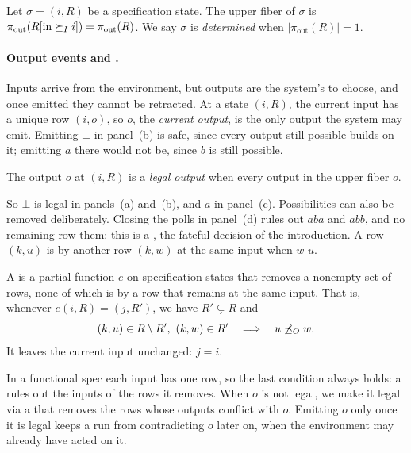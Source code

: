 \begin{definition}
\label{def:determined}
Let $\sigma = (i, R)$ be a specification state.  The upper fiber of $\sigma$
is $\pi_{\mathrm{out}}(R[\mathrm{in}\succeq_I i]) = \pi_{\mathrm{out}}(R)$.
We say $\sigma$ is \emph{determined} when $|\pi_{\mathrm{out}}(R)|=1$.
\end{definition}

\paragraph{Output events and \commitments.}
Inputs arrive from the environment, but outputs are the system's to choose, and
once emitted they cannot be retracted.  At a state $(i,R)$, the current input
has a unique row $(i,o)$, so $o$, the \emph{current output}, is the only output
the system may emit.  Emitting $\bot$ in panel~(b) is safe, since every output
still possible builds on it; emitting $a$ there would not be, since $b$ is
still possible.

\begin{definition}
\label{def:exposable}
The output $o$ at $(i,R)$ is a \emph{legal output} when every output in the
upper fiber \outrel $o$.
\end{definition}

So $\bot$ is legal in panels~(a) and~(b), and $a$ in panel~(c).  Possibilities
can also be removed deliberately.  Closing the polls in panel~(d) rules out
$aba$ and $abb$, and no remaining row \outrel them: this is a \commitment,
the fateful decision of the introduction.  A row $(k,u)$ is \emph{\outrelpast} by another
row $(k,w)$ at the same input when $w$ \outrel $u$.

\begin{definition}[\Commitment]
\label{def:commitment}
A \emph{\commitment} is a partial function $e$ on specification states that
removes a nonempty set of rows, none of which is \outrelpast by a row that
remains at the same input.  That is, whenever $e(i,R)=(j,R')$, we have
$R'\subsetneq R$ and
\begin{equation}
  (k,u)\in R\setminus R',\ (k,w)\in R'
  \quad\Longrightarrow\quad
  u\not\preceq_O w.
  \label{eq:commitment-unsubsumed}
\end{equation}
It leaves the current input unchanged: $j=i$.
\end{definition}

In a functional spec each input has one row, so the last condition always
holds: a \commitment rules out the inputs of the rows it removes.  When $o$ is not legal,
we make it legal via a \commitment that removes the rows whose outputs conflict
with $o$.  Emitting $o$ only once it is legal keeps a run from
contradicting $o$ later on, when the environment may already have acted on it.


